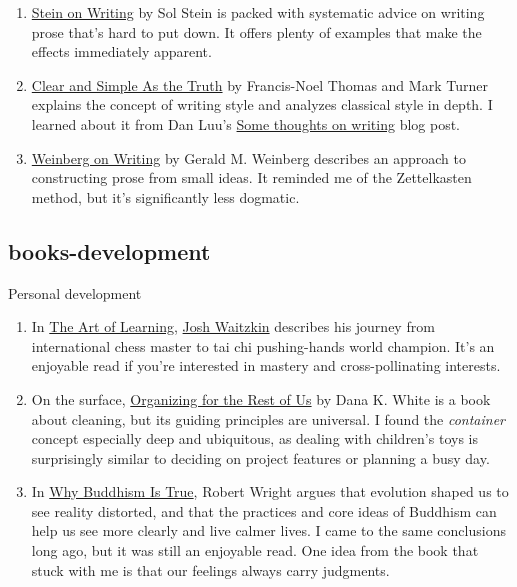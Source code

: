 \documentclass{article}
\begin{document}
\begin{enumerate}
\item
  \href{https://www.goodreads.com/book/show/186004.Stein_on_Writing}{Stein on Writing} by Sol Stein
  is packed with systematic advice on writing prose that's hard to put down.
  It offers plenty of examples that make the effects immediately apparent.
\item
  \href{https://www.goodreads.com/book/show/120549.Clear_and_Simple_As_the_Truth}{Clear and Simple As the Truth} by Francis-Noel Thomas and Mark Turner
  explains the concept of writing style
  and analyzes classical style in depth.
  I learned about it from Dan Luu's \href{https://danluu.com/writing-non-advice/}{Some thoughts on writing} blog post.
\item
  \href{https://www.goodreads.com/book/show/302021.Weinberg_on_Writing}{Weinberg on Writing}
  by Gerald M. Weinberg describes an approach to constructing prose from small ideas.
  It reminded me of the Zettelkasten method,
  but it's significantly less dogmatic.
\end{enumerate}

\subsection{books-development}{Personal development}
\begin{enumerate}
\item
  In \href{https://www.goodreads.com/book/show/857333.The_Art_of_Learning}{The Art of Learning},
  \href{https://www.joshwaitzkin.com/josh}{Josh Waitzkin} describes his journey from international chess master
  to tai chi pushing-hands world champion.
  It's an enjoyable read
  if you're interested in mastery and cross-pollinating interests.
\item
  On the surface, \href{https://www.goodreads.com/book/show/57468188-organizing-for-the-rest-of-us}{Organizing for the Rest of Us} by Dana K. White
  is a book about cleaning,
  but its guiding principles are universal.
  I found the \emph{container} concept especially deep and ubiquitous,
  as dealing with children's toys is surprisingly similar
  to deciding on project features
  or planning a busy day.
\item
  In \href{https://www.goodreads.com/book/show/32895535-why-buddhism-is-true}{Why Buddhism Is True}, Robert Wright argues
  that evolution shaped us to see reality distorted,
  and that the practices and core ideas of Buddhism can help us see more clearly
  and live calmer lives.
  I came to the same conclusions long ago,
  but it was still an enjoyable read.
  One idea from the book that stuck with me is that
  our feelings always carry judgments.
\end{enumerate}
\end{document}
